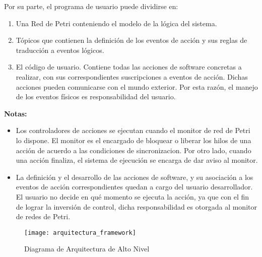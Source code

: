 Por su parte, el programa de usuario puede dividirse en:
\begin{enumerate}
  \item Una Red de Petri conteniendo el modelo de la lógica del sistema.
  \item Tópicos que contienen la definición de los eventos de acción y sus
  reglas de traducción a eventos lógicos.
  \item El código de usuario. Contiene todas las acciones de software
	concretas a realizar, con sus correspondientes suscripciones a eventos
	de acción. Dichas acciones pueden comunicarse con el mundo exterior. Por esta
	razón, el manejo de los eventos físicos es responsabilidad del usuario.
\end{enumerate}

\begin{framed}
\textbf{Notas:} 
\begin{itemize}
\item Los controladores de acciones se ejecutan cuando el monitor de red de
Petri lo dispone. El monitor es el encargado de bloquear o liberar los hilos de una
acción de acuerdo a las condiciones de sincronizacion. Por otro lado, cuando una
acción finaliza, el sistema de ejecución se encarga de dar aviso al monitor.

\item La definición y el desarrollo de las acciones de software, y su
asociación a los eventos de acción correspondientes quedan a cargo del usuario
desarrollador. El usuario no decide en qué momento se ejecuta la acción, ya que
con el fin de lograr la inversión de control, dicha responsabilidad es otorgada
al monitor de redes de Petri.
\end{itemize}
\end{framed}



\begin{figure}[h]
	\centering
	\texttt{[image: arquitectura\_framework]}
	\caption{Diagrama de Arquitectura de Alto Nivel}
	\label{fig:arquitectura_petri-manejador-acciones-mundo}
\end{figure}
